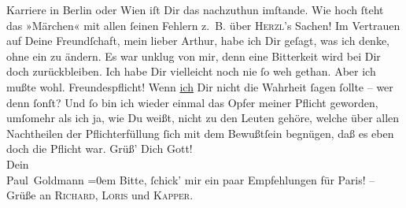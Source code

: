 \begin{ledgroupsized}[t]{13cm}
{{{                  Karriere}}}\label{K_L02674-69h} in Berlin oder Wien iſt Dir das {\pb}nachzuthun imſtande. Wie hoch ſteht das »Märchen« mit allen ſeinen Fehlern z. B. über \textsc{Herzl}’s Sachen! {\dotsfour}\pend
           \pstart
           Im Vertrauen auf Deine Freundſchaft, mein lieber Arthur, habe ich Dir geſagt, was ich
               denke, ohne ein \label{K_L02674-4v}\label{K_L02674-4h} zu ändern. Es war unklug von mir, denn eine
               Bitterkeit wird bei Dir doch zurückbleiben. Ich habe Dir vielleicht noch nie ſo weh
               gethan. Aber ich mußte wohl. Freundespflicht! Wenn \uline{ich} Dir nicht die Wahrheit ſagen ſollte – wer  denn ſonſt? Und ſo bin ich wieder einmal das Opfer meiner Pflicht geworden,
               umſomehr als ich ja, wie Du weißt, nicht zu den Leuten gehöre, welche über allen
               Nachtheilen der Pflichterfüllung ſich mit dem Bewußtſein begnügen, daß es eben doch
               die Pflicht war.\pend
           \pstart
           Grüß’ Dich Gott!{\\[\baselineskip]}Dein{\\[\baselineskip]}\spacefill\mbox{Paul Goldmann}\pend
           \leftskip=0em{}\pstart
           \noindent{}Bitte, ſchick’ mir ein paar Empfehlungen für Paris! – Grüße an \textsc{Richard}, \textsc{Loris} und \textsc{Kapper}.\pend
           \endnumbering{}\end{ledgroupsized}  \newcommand{\dateiname}{L02674}\newcommand{\titel}{Paul Goldmann an Arthur Schnitzler, 12. 12. [1891]}\newcommand{\editorInnen}{Martin Anton Müller und Laura Untner}
            \footnotesize
\begin{ledgroupsized}[t]{11.5cm}
\end{ledgroupsized}
         
      